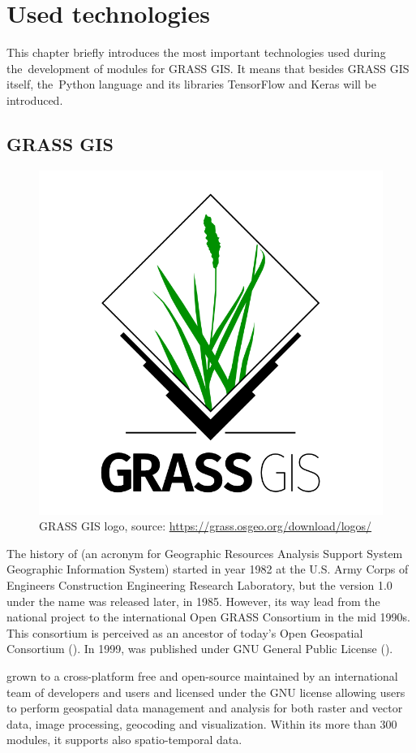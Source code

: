 \chapter{Used technologies}
\label{technologies}

This chapter briefly introduces the most important technologies used during
the~development of modules for GRASS GIS. It means that besides GRASS GIS itself, 
the~Python language and its libraries TensorFlow and Keras will be introduced.

\section{GRASS GIS}
\label{grass}

\begin{figure}[H]
   \centering
	\includegraphics[width=0.4\linewidth]{./pictures/grass-logo.png}
	\caption[GRASS GIS logo]{GRASS GIS logo, source: \url{https://grass.osgeo.org/download/logos/}}
      \label{fig:grass-logo}
\end{figure}

The history of   (an acronym for Geographic Resources Analysis 
Support System Geographic Information System) started in year 1982 at the U.S. 
Army Corps of Engineers Construction Engineering Research Laboratory, but the 
version 1.0 under the name  was released later, in 1985. However, its 
way lead from the national project to the international Open GRASS Consortium in 
the mid 1990s. This consortium is perceived as an ancestor of today's Open 
Geospatial Consortium (). In 1999,   was published 
under GNU General Public License ().

  grown to a cross-platform free and open-source  
maintained by an international team of developers and users and licensed under 
the GNU  license allowing users to perform geospatial data management 
and analysis for both raster and vector data, image processing, geocoding and 
visualization. Within its more than 300 modules, it supports also 
spatio-temporal data.

